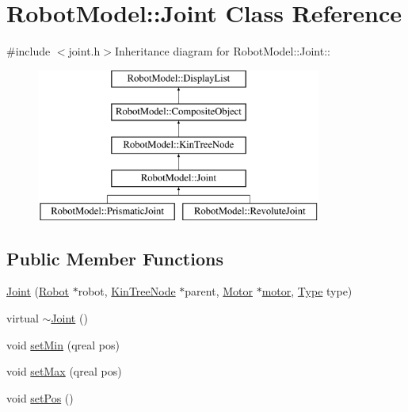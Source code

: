 \hypertarget{class_robot_model_1_1_joint}{
\section{RobotModel::Joint Class Reference}
\label{class_robot_model_1_1_joint}
}


{\ttfamily \#include $<$joint.h$>$}Inheritance diagram for RobotModel::Joint::\begin{figure}[H]
\begin{center}
\leavevmode
\includegraphics[height=5cm]{class_robot_model_1_1_joint}
\end{center}
\end{figure}
\subsection*{Public Member Functions}
\begin{DoxyCompactItemize}
\item 
\hyperlink{class_robot_model_1_1_joint_ac0077acd1f45742c84c3468cce889600}{Joint} (\hyperlink{class_robot_model_1_1_robot}{Robot} $\ast$robot, \hyperlink{class_robot_model_1_1_kin_tree_node}{KinTreeNode} $\ast$parent, \hyperlink{class_robot_model_1_1_motor}{Motor} $\ast$\hyperlink{class_robot_model_1_1_joint_a9fe40b0c9b6562d7a4cce3dd8715f945}{motor}, \hyperlink{class_robot_model_1_1_kin_tree_node_a6cc10fb82046bd1d9f61b806756ad176}{Type} type)
\item 
virtual \hyperlink{class_robot_model_1_1_joint_a42aca0bd1832136984923713127c28f1}{$\sim$Joint} ()
\item 
void \hyperlink{class_robot_model_1_1_joint_ad982580bf8c0d721babaf93d990cf5d7}{setMin} (qreal pos)
\item 
void \hyperlink{class_robot_model_1_1_joint_a48523fd1cf98af4b0856257cde75f486}{setMax} (qreal pos)
\item 
void \hyperlink{class_robot_model_1_1_joint_a4fc5a8c53c2a2c5839409d90fb0825e1}{setPos} ()
\end{DoxyCompactItemize}
